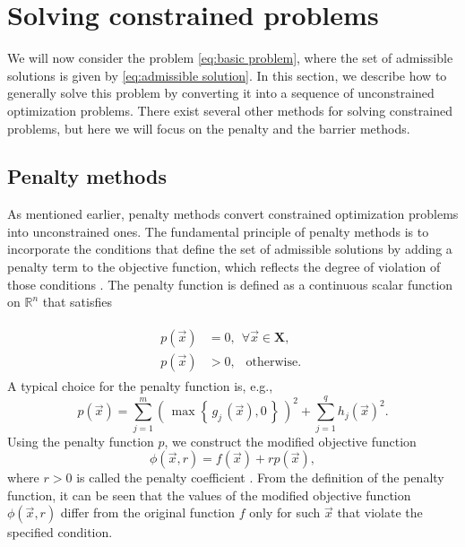 \section{Solving constrained problems}\label{constrained}
We will now consider the problem \ref{eq:basic problem}, where the set of admissible solutions is given by \ref{eq:admissible solution}. In this section, we describe how to generally solve this problem by converting it into a sequence of unconstrained optimization problems. There exist several other methods for solving constrained problems, but here we will focus on the penalty and the barrier methods.

\subsection{Penalty methods}\label{penalty method}
As mentioned earlier, penalty methods convert constrained optimization problems into unconstrained ones. The fundamental principle of penalty methods is to incorporate the conditions that define the set of admissible solutions by adding a penalty term to the objective function, which reflects the degree of violation of those conditions \cite{Bert}. The penalty function is defined as a continuous scalar function on $ \mathbb{R}^n $ that satisfies

\begin{align}
	\begin{split}
		p(\vec{x}) &= 0, \ \ \forall \vec{x} \in \mathbf{X},\\[6pt]
		p(\vec{x}) &> 0, \ \ \text { otherwise. }
	\end{split}
\end{align}
A typical choice for the penalty function is, e.g.,
\begin{equation}\label{eq:penalty function}
	p (\vec{x}) = \sum_{j=1}^{m} \left( \, \max  \left\{ \, g_j \, (\vec{x}), 0 \, \right\} \, \right)^2 + \sum_{j=1}^{q} h_j (\vec{x})^2.
\end{equation}
Using the penalty function $ p $, we construct the modified objective function
\begin{equation}\label{eq:cost function with penalty}
	\phi (\vec{x}, r) = f (\vec{x}) + r p(\vec{x}),
\end{equation}
where $ r > 0 $ is called the penalty coefficient \cite{Bert}. From the definition of the penalty function, it can be seen that the values of the modified objective function $ \phi (\vec{x}, r)$ differ from the original function $ f $ only for such $ \vec{x} $ that violate the specified condition.

